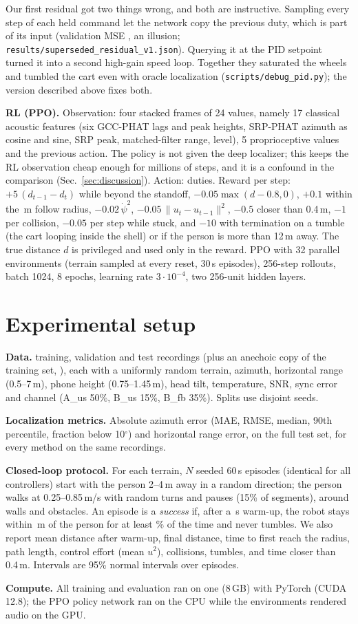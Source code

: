 Our first residual got two things wrong, and both are instructive. Sampling every step of
each held command let the network copy the previous duty, which is part of its input (validation
MSE \ResOldValMSE, an illusion; \texttt{results/superseded\_residual\_v1.json}). Querying it at the PID setpoint turned it into a second
high-gain speed loop. Together they saturated the wheels and tumbled the cart even with oracle
localization (\texttt{scripts/debug\_pid.py}); the version described above fixes both.

\textbf{RL (PPO).} Observation: four stacked frames of 24 values, namely 17 classical acoustic
features (six GCC-PHAT lags and peak heights, SRP-PHAT azimuth as cosine and sine, SRP peak,
matched-filter range, level), 5 proprioceptive values and the previous action. The policy is not
given the deep localizer; this keeps the RL observation cheap enough for millions of steps, and
it is a confound in the comparison (Sec.~\ref{sec:discussion}). Action: duties. Reward per step:
$+5\,(d_{t-1}-d_t)$ while beyond the standoff, $-0.05\max(d-0.8,0)$, $+0.1$ within the
\FollowRadius\,m follow radius, $-0.02\,\dot\psi^2$, $-0.05\,\lVert u_t-u_{t-1}\rVert^2$, $-0.5$
closer than 0.4\,m, $-1$ per collision, $-0.05$ per step while stuck, and $-10$ with termination
on a tumble (the cart looping inside the shell) or if the person is more than 12\,m away. The
true distance $d$ is privileged and used only in the reward. PPO with 32 parallel environments
(terrain sampled at every reset, 30\,s episodes), 256-step rollouts, batch 1024, 8 epochs, learning
rate $3\cdot10^{-4}$, two 256-unit hidden layers.

\section{Experimental setup}

\textbf{Data.} \NTrainSet{} training, \NValSet{} validation and \NTestSet{} test recordings (plus
an anechoic copy of the training set, \NAnechoicSet), each with a uniformly random terrain,
azimuth, horizontal range (0.5--7\,m), phone height (0.75--1.45\,m), head tilt, temperature,
SNR, sync error and channel (A\_us 50\%, B\_us 15\%, B\_fb 35\%). Splits use disjoint seeds.

\textbf{Localization metrics.} Absolute azimuth error (MAE, RMSE, median, 90th percentile,
fraction below 10$^\circ$) and horizontal range error, on the full test set, for every method on
the same recordings.

\textbf{Closed-loop protocol.} For each terrain, $N$ seeded 60\,s episodes (identical for all
controllers) start with the person 2--4\,m away in a random direction; the person walks at
0.25--0.85\,m/s with random turns and pauses (15\% of segments), around walls and obstacles. An episode is a
\emph{success} if, after a \WarmupS\,s warm-up, the robot stays within \FollowRadius\,m of the
person for at least \SuccessFrac\% of the time and never tumbles. We also report mean distance
after warm-up, final distance, time to first reach the radius, path length, control effort
(mean $u^2$), collisions, tumbles, and time closer than 0.4\,m. Intervals are 95\% normal
intervals over episodes.

\textbf{Compute.} All training and evaluation ran on one \GPU{} (8\,GB) with PyTorch
\TorchVersion{} (CUDA 12.8); the PPO policy network ran on the CPU while the environments
rendered audio on the GPU.


